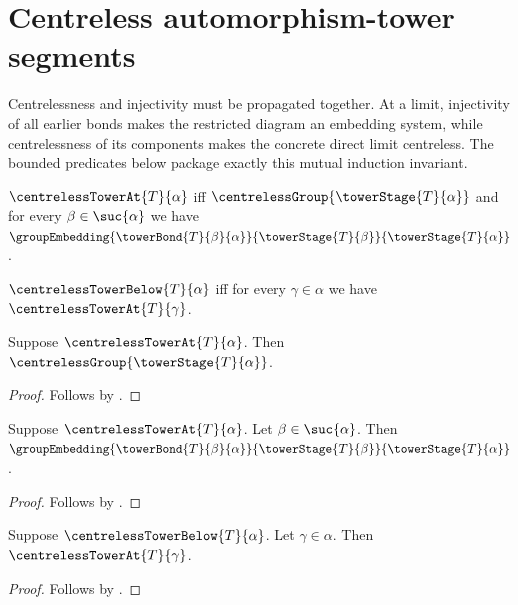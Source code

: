 



\section{Centreless automorphism-tower segments}

Centrelessness and injectivity must be propagated together.  At a limit,
injectivity of all earlier bonds makes the restricted diagram an embedding
system, while centrelessness of its components makes the concrete direct
limit centreless.  The bounded predicates below package exactly this mutual
induction invariant.

\begin{definition}\label{centreless_tower_at}
    $\centrelessTowerAt{T}{\alpha}$ iff
        $\centrelessGroup{\towerStage{T}{\alpha}}$ and
        for every $\beta\in\suc{\alpha}$ we have
            $\groupEmbedding
                {\towerBond{T}{\beta}{\alpha}}
                {\towerStage{T}{\beta}}
                {\towerStage{T}{\alpha}}$.
\end{definition}

\begin{definition}\label{centreless_tower_below}
    $\centrelessTowerBelow{T}{\alpha}$ iff
        for every $\gamma\in\alpha$ we have
            $\centrelessTowerAt{T}{\gamma}$.
\end{definition}

\begin{proposition}\label{centreless_tower_at_stage}
    Suppose $\centrelessTowerAt{T}{\alpha}$.
    Then $\centrelessGroup{\towerStage{T}{\alpha}}$.
\end{proposition}
\begin{proof}
    Follows by .
\end{proof}

\begin{proposition}\label{centreless_tower_at_bond}
    Suppose $\centrelessTowerAt{T}{\alpha}$.
    Let $\beta\in\suc{\alpha}$.
    Then $\groupEmbedding
        {\towerBond{T}{\beta}{\alpha}}
        {\towerStage{T}{\beta}}
        {\towerStage{T}{\alpha}}$.
\end{proposition}
\begin{proof}
    Follows by .
\end{proof}

\begin{proposition}\label{centreless_tower_below_at}
    Suppose $\centrelessTowerBelow{T}{\alpha}$.
    Let $\gamma\in\alpha$.
    Then $\centrelessTowerAt{T}{\gamma}$.
\end{proposition}
\begin{proof}
    Follows by .
\end{proof}


